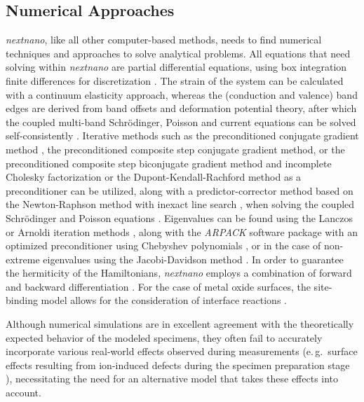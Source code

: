 \subsection{Numerical Approaches} \label{ssec:numerical-approaches}
\emph{nextnano}, like all other computer-based methods, needs to find numerical techniques and approaches to solve analytical problems. All equations that need solving within \emph{nextnano} are partial differential equations, using box integration finite differences for discretization \cite{Trellakis2006}. The strain of the system can be calculated with a continuum elasticity approach, whereas the (conduction and valence) band edges are derived from band offsets and deformation potential theory, after which the coupled multi-band Schrödinger, Poisson and current equations can be solved self-consistently \cite{Birner2006,Birner2007}. Iterative methods \cite{Greenbaum1997,Bai2000} such as the preconditioned conjugate gradient method \cite{Hestenes1952}, the preconditioned composite step conjugate gradient method, or the preconditioned composite step biconjugate gradient method \cite{Lanczos1952,Bank1993} and incomplete Cholesky factorization \cite{Meijerink1977} or the Dupont-Kendall-Rachford method \cite{Dupont1968} as a preconditioner can be utilized, along with a predictor-corrector method based on the Newton-Raphson method with inexact line search \cite{Trellakis1997}, when solving the coupled Schrödinger and Poisson equations \cite{Birner2006}. Eigenvalues can be found using the Lanczos or Arnoldi iteration methods \cite{Greenbaum1997,Bai2000,Birner2006}, along with the \emph{ARPACK} software package with an optimized preconditioner using Chebyshev polynomials \cite{Lehoucq1998,Birner2006}, or in the case of non-extreme eigenvalues using the Jacobi-Davidson method \cite{Sleijpen1996}. In order to guarantee the hermiticity of the Hamiltonians, \emph{nextnano} employs a combination of forward and backward differentiation \cite{Birner2006}. For the case of metal oxide surfaces, the site-binding model allows for the consideration of interface reactions \cite{Bergveld1970,Healy1978,Bayer2005,Birner2006}.

Although numerical simulations are in excellent agreement with the theoretically expected behavior of the modeled specimens, they often fail to accurately incorporate various real-world effects observed during measurements (e.\,g.\ surface effects resulting from ion-induced defects during the specimen preparation stage \cite{Twitchett2002,Beleggia2003,Cooper2006,Cooper2007,Twitchett-Harrison2007,Cooper2009,Somodi2013,Yazdi2015}), necessitating the need for an alternative model that takes these effects into account.
